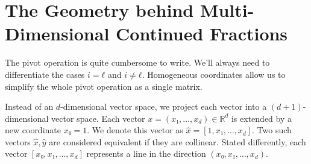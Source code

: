 \section{The Geometry behind Multi-Dimensional Continued Fractions}

The pivot operation is quite cumbersome to write.
We'll always need to differentiate the cases $i = ℓ$ and $i ≠ ℓ$.
Homogeneous coordinates allow us to simplify the whole pivot operation as a single matrix.

Instead of an $d$-dimensional vector space, we project each vector into a $(d+1)$-dimensional vector space.
Each vector $x = (x₁, …, x_d) ∈ ℝ^d$ is extended by a new coordinate $x₀ = 1$.
We denote this vector as $\hat x = [1, x₁, …, x_d]$.
Two such vectors $\hat x, \hat y$ are considered equivalent if they are collinear.
Stated differently, each vector $[x₀, x₁, …, x_d]$ represents a line in the direction $(x₀, x₁, …, x_d)$.

\begin{center}
\end{center}

